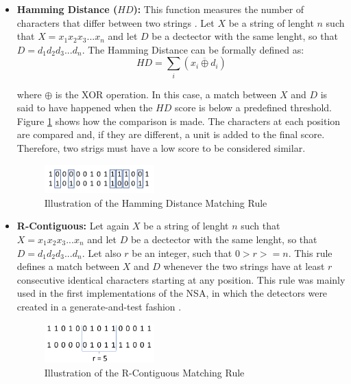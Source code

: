 \begin{itemize}
    \item \textbf{Hamming Distance (\(HD\)):} This function measures the number of characters that differ between two strings \cite{ICBook2009}.  Let \(X\) be a string of lenght \(n\) such that \(X = x_1 x_2 x_3...x_n\) and let \(D\) be a dectector with the same lenght, so that \(D = d_1 d_2 d_3...d_n\). The Hamming Distance can be formally defined as:
    \[HD = \sum_i(\overline{x_i \oplus d_i})\]
	 
	where \( \oplus \) is the XOR operation. In this case, a match between \(X\) and \(D\) is said to have happened when the \(HD\) score is below a predefined threshold. Figure \ref{fig:hamm} shows how the comparison is made. The characters at each position are compared and, if they are different, a unit is added to the final score. Therefore, two strigs must have a low score to be considered similar.

	\begin{figure}[!h]
		\centering
		\includegraphics[width=0.4\textwidth, keepaspectratio]{img/hamming.png}
		\caption{Illustration of the Hamming Distance Matching Rule}
		\label{fig:hamm}
	\end{figure}
    
    \item \textbf{R-Contiguous:} Let again \(X\) be a string of lenght \(n\) such that \(X = x_1 x_2 x_3...x_n\) and let \(D\) be a dectector with the same lenght, so that \(D = d_1 d_2 d_3...d_n\). Let also \(r\) be an integer, such that \(0 > r >= n\). This rule defines a match between \(X\) and \(D\) whenever the two strings have at least \(r\) consecutive identical characters starting at any position. This rule was mainly used in the first implementations of the NSA, in which the detectors were created in a generate-and-test fashion \cite{EffectBinaryRule2003}.
    
	\begin{figure}[!h]
		\centering
		\includegraphics[width=0.4\textwidth, keepaspectratio]{img/rcontiguous.png}
		\caption{Illustration of the R-Contiguous Matching Rule}
		\label{fig:rcont}
	\end{figure}


\end{itemize}
